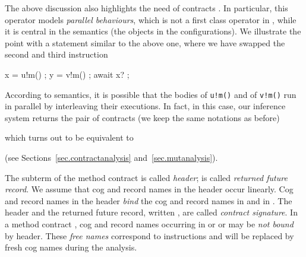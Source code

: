 The above discussion also highlights the need of contracts 
. In particular, this operator models \emph{ parallel
behaviours}, which is not a first class operator in {\coreABS}, while it is 
central in the semantics (the objects in the configurations). 
We illustrate the point with a statement similar to the above one, where we have
swapped the second and third instruction
\begin{absexamplen}
x = u!m() ;
y = v!m() ;
await x? ;
\end{absexamplen}
According to {\coreABS} semantics, it is possible that the bodies of
{\tt u!m()} and of {\tt v!m()} run in parallel by interleaving their executions. 
In fact, in this case, our inference system returns the pair of contracts (we keep
the same notations as before) 

which turns out to be equivalent to 

(see Sections~\ref{sec.contractanalysis}
and~\ref{sec.mutanalysis}).



The subterm  of the method contract 
is called 
\emph{header};
 is called \emph{returned future record}. We assume that cog and record
names in the header occur linearly. Cog and record names in the header \emph{bind} the 
cog and record names in  and in .
The header and the returned
future record, written , are called \emph{contract signature}. In a method contract , cog and record names occurring in  or  or 
 may be \emph{not bound} by header. These \emph{free names} correspond to 
 instructions and will be replaced by fresh cog names during the analysis.



\fi

\medskip

